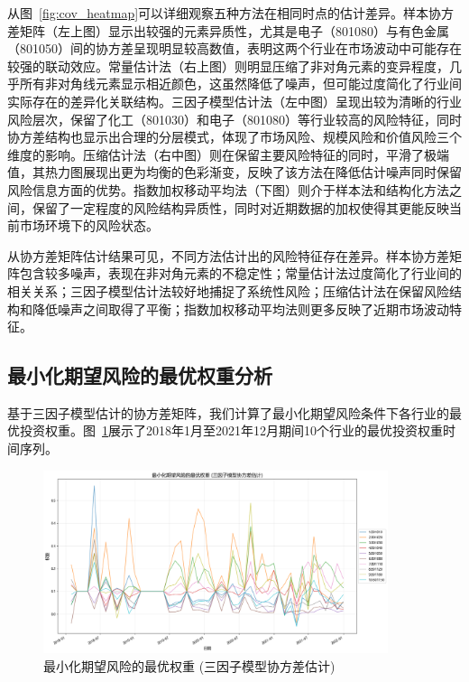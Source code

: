 \documentclass[12pt, a4paper]{article}
\begin{document}
从图~\ref{fig:cov_heatmap}可以详细观察五种方法在相同时点的估计差异。样本协方差矩阵（左上图）显示出较强的元素异质性，尤其是电子（801080）与有色金属（801050）间的协方差呈现明显较高数值，表明这两个行业在市场波动中可能存在较强的联动效应。常量估计法（右上图）则明显压缩了非对角元素的变异程度，几乎所有非对角线元素显示相近颜色，这虽然降低了噪声，但可能过度简化了行业间实际存在的差异化关联结构。三因子模型估计法（左中图）呈现出较为清晰的行业风险层次，保留了化工（801030）和电子（801080）等行业较高的风险特征，同时协方差结构也显示出合理的分层模式，体现了市场风险、规模风险和价值风险三个维度的影响。压缩估计法（右中图）则在保留主要风险特征的同时，平滑了极端值，其热力图展现出更为均衡的色彩渐变，反映了该方法在降低估计噪声同时保留风险信息方面的优势。指数加权移动平均法（下图）则介于样本法和结构化方法之间，保留了一定程度的风险结构异质性，同时对近期数据的加权使得其更能反映当前市场环境下的风险状态。

从协方差矩阵估计结果可见，不同方法估计出的风险特征存在差异。样本协方差矩阵包含较多噪声，表现在非对角元素的不稳定性；常量估计法过度简化了行业间的相关关系；三因子模型估计法较好地捕捉了系统性风险；压缩估计法在保留风险结构和降低噪声之间取得了平衡；指数加权移动平均法则更多反映了近期市场波动特征。

\subsection{最小化期望风险的最优权重分析}

基于三因子模型估计的协方差矩阵，我们计算了最小化期望风险条件下各行业的最优投资权重。图~\ref{fig:min_var_weights}展示了2018年1月至2021年12月期间10个行业的最优投资权重时间序列。

\begin{figure}[htbp]
\centering
\includegraphics[width=0.9\textwidth]{./img/min_var_weights.png}
\caption{最小化期望风险的最优权重 (三因子模型协方差估计)}
\label{fig:min_var_weights}
\end{figure}
\end{document}
